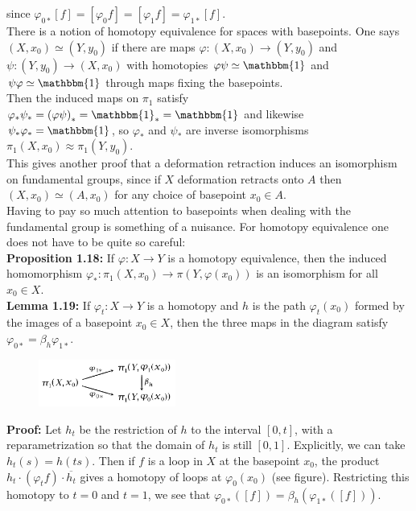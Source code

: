 \documentclass[a4paper]{article}
\begin{document}
since $\varphi_{0*}\left[ f \right]  = \left[ \varphi_0 f \right] = 
\left[ \varphi_1 f \right] = \varphi_{1*} \left[ f \right] $.\\
\linebreak
There is a notion of homotopy equivalence for spaces with basepoints. One says
$\left( X, x_0 \right) \simeq \left( Y, y_0 \right) $ if there are maps
$\varphi  \colon \left( X, x_0 \right)  \to \left( Y, y_0 \right) $ and
$\psi  \colon \left( Y, y_0 \right) \to \left( X, x_0 \right) $ 
with homotopies $\varphi \psi \simeq \mathbbm{1}$ and $\psi \varphi \simeq
\mathbbm{1}$ through maps fixing the basepoints.\\
Then the induced maps on $\pi_1$ satisfy $\varphi_* \psi_* = 
\left( \varphi \psi \right)_* = \mathbbm{1}_* = \mathbbm{1} $ and likewise
$\psi_* \varphi_* = \mathbbm{1}$, so $\varphi_*$ and $\psi_*$ are inverse
isomorphisms $\pi_1 \left( X, x_0 \right) 
\approx \pi_1 \left( Y, y_0 \right) $.\\
\linebreak
This gives another proof that a deformation retraction induces an isomorphism
on
fundamental groups, since if $X$ deformation retracts onto $A$ then
$\left( X, x_0 \right) \simeq \left( A, x_0 \right) $ for any choice of
basepoint $x_0 \in A$.\\
\linebreak
Having to pay so much attention to basepoints when dealing with the fundamental
group is something of a nuisance. For homotopy equivalence one does not have to
be quite so careful:\\
\linebreak
\textbf{Proposition 1.18:} If $\varphi  \colon X\to Y$ is a homotopy
equivalence, then the induced homomorphism $\varphi_*  \colon
\pi_1 \left( X, x_0 \right) \to \pi \left( Y, \varphi(x_0) \right) $ is an
isomorphism for all $x_0 \in X$.\\
\linebreak
\textbf{Lemma 1.19:} If $\varphi_t  \colon X\to Y$ is a homotopy and $h$ is the
path $\varphi_t (x_0)$ formed by the images of a basepoint $x_0 \in X$, then
the three maps in the diagram satisfy $\varphi_{0*} = \beta_h \varphi_{1*}$.
\begin{figure}[H]
    \centering
    \includegraphics[width=0.4\textwidth]{lemma119.png}
    \label{fig:lemma119-png}
\end{figure}
\textbf{Proof:} Let $h_t$ be the restriction of $h$ to the interval $\left[ 0,t
\right] $,
with a reparametrization so that the domain of $h_t$ is still 
 $\left[ 0,1 \right] $. Explicitly, we can take $h_t (s) = h(ts)$. Then
 if $f$ is a loop in $X$ at the basepoint $x_0$, the product 
 $h_t \cdot \left( \varphi_t f \right) \cdot \overline{h_t}$ gives
 a homotopy of loops at $\varphi_0 (x_0)$ (see figure). Restricting this
 homotopy to $t=0$ and $t=1$, we see that $\varphi_{0*}\left( \left[ f \right]  \right) 
 = \beta_h \left( \varphi_{1*}\left( \left[ f \right]  \right)  \right) $.
\end{document}
